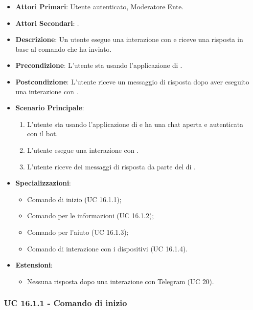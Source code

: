 	\begin{itemize}
		\item \textbf{Attori Primari}: Utente autenticato, Moderatore Ente.
		\item \textbf{Attori Secondari}: .
		\item \textbf{Descrizione}: Un utente esegue una interazione con  e riceve una risposta in base al comando che ha inviato. 
		\item \textbf{Precondizione}: L'utente sta usando l'applicazione di .
		\item \textbf{Postcondizione}: L'utente riceve un messaggio di risposta dopo aver eseguito una interazione con .
		\item \textbf{Scenario Principale}:
		\begin{enumerate}
			\item L'utente sta usando l'applicazione di  e ha una chat aperta e autenticata con il bot. 
			\item L'utente esegue una interazione con .
			\item L'utente riceve dei messaggi di risposta da parte del  di .
		\end{enumerate}
		\item \textbf{Specializzazioni}:
		\begin{itemize}
			\item Comando di inizio (UC 16.1.1);
			\item Comando per le informazioni (UC 16.1.2);
			\item Comando per l'aiuto (UC 16.1.3);
			\item Comando di interazione con i dispositivi (UC 16.1.4).
		\end{itemize}
		\item \textbf{Estensioni}:
		\begin{itemize}
			\item Nessuna risposta dopo una interazione con Telegram (UC 20).
		\end{itemize}
	\end{itemize}

	\subsubsection{UC 16.1.1 - Comando di inizio}

